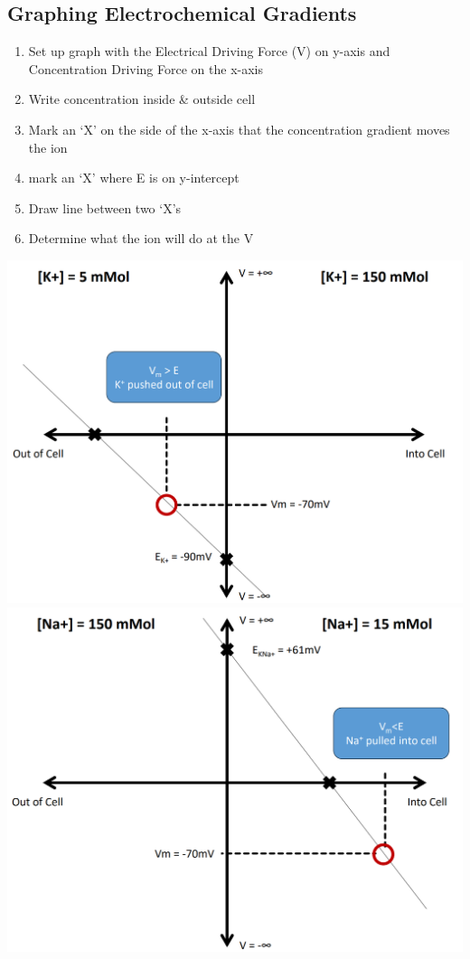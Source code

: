 \documentclass[11pt,fleqn]{book} %
\begin{document}
\subsection{Graphing Electrochemical Gradients}
\begin{enumerate}
    \item Set up graph with the Electrical Driving Force (V) on y-axis and Concentration Driving Force on the x-axis
    \item Write concentration inside \& outside cell
    \item Mark an ‘X’ on the side of the x-axis that the concentration gradient moves the ion
    \item mark an ‘X’ where E is on y-intercept
    \item Draw line between two ‘X’s
    \item Determine what the ion will do at the V
\end{enumerate}
\begin{center}
    \includegraphics[width=0.65\linewidth]{Pictures/Screenshot 2024-02-25 220308.png}
    \includegraphics[width=0.65\linewidth]{Pictures/Screenshot 2024-02-25 222320.png}
\end{center}
\end{document}
